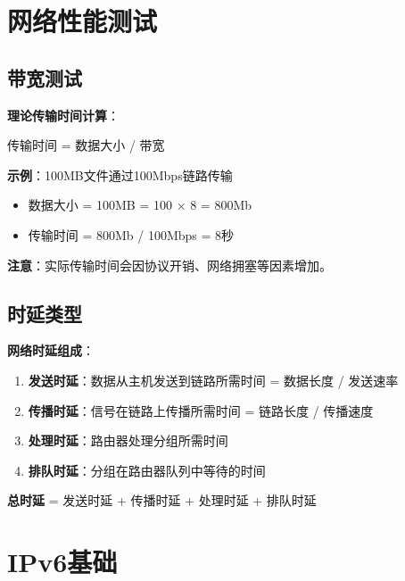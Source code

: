 \documentclass[12pt,a4paper]{ctexart}
\begin{document}
\section{网络性能测试}

\subsection{带宽测试}

\begin{keybox}
\textbf{理论传输时间计算}：

传输时间 = 数据大小 / 带宽

\textbf{示例}：100MB文件通过100Mbps链路传输
\begin{itemize}[itemsep=0pt]
    \item 数据大小 = 100MB = 100 × 8 = 800Mb
    \item 传输时间 = 800Mb / 100Mbps = 8秒
\end{itemize}

\textbf{注意}：实际传输时间会因协议开销、网络拥塞等因素增加。
\end{keybox}

\subsection{时延类型}

\begin{keybox}
\textbf{网络时延组成}：

\begin{enumerate}[itemsep=0pt]
    \item \textbf{发送时延}：数据从主机发送到链路所需时间 = 数据长度 / 发送速率
    \item \textbf{传播时延}：信号在链路上传播所需时间 = 链路长度 / 传播速度
    \item \textbf{处理时延}：路由器处理分组所需时间
    \item \textbf{排队时延}：分组在路由器队列中等待的时间
\end{enumerate}

\textbf{总时延} = 发送时延 + 传播时延 + 处理时延 + 排队时延
\end{keybox}

\section{IPv6基础}
\end{document}
